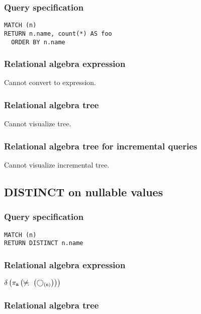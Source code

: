 \subsubsection*{Query specification}

\begin{lstlisting}
MATCH (n)
RETURN n.name, count(*) AS foo
  ORDER BY n.name
\end{lstlisting}

\subsubsection*{Relational algebra expression}

Cannot convert to expression.

\subsubsection*{Relational algebra tree}

Cannot visualize tree.

\subsubsection*{Relational algebra tree for incremental queries}

Cannot visualize incremental tree.

\subsection{DISTINCT on nullable values}

\subsubsection*{Query specification}

\begin{lstlisting}
MATCH (n)
RETURN DISTINCT n.name
\end{lstlisting}

\subsubsection*{Relational algebra expression}

$\duplicateelimination \left(\projection{\var{n}} \left(\alldifferent{} \left(\getvertices{n}{}\right)\right)\right)$

\subsubsection*{Relational algebra tree}

